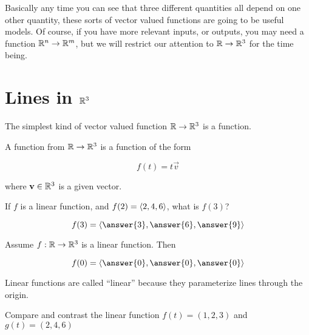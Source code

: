\documentclass{ximera}
\begin{document}
Basically any time you can see that three different quantities all depend on one other quantity, these sorts of vector valued functions are going to be useful models.  Of course, if you have more relevant inputs, or outputs, you may need a function $\mathbb R^n \to \mathbb R^m$, but we will restrict our attention to $\mathbb R \to \mathbb R^3$ for the time being.

\section{Lines in $\mathbb R^3$}

The simplest kind of vector valued function  $\mathbb R \to \mathbb R^3$ is a  function.

\begin{definition}
	A  function from $\mathbb R \to \mathbb R^3$ is a function of the form
	
	\[
	f(t) = t\vec{v}
	\] 
	
	where $\mathbf{v} \in \mathbb R^3$ is a given vector.
 \end{definition} 
 
 \begin{question}
 	If $f$ is a linear function, and $f(2) = \left\langle 2,4,6\right\rangle$, what is $f(3)$?
	
\[	
	f(3) = \vector{\answer{3},\answer{6},\answer{9}}
\]
 \end{question}
 
 \begin{question}
 	Assume $f:\mathbb R \to \mathbb R^3$ is a linear function.  Then 
	
	\[
	f(0) = \vector{\answer{0},\answer{0},\answer{0}}
	\]
 \end{question}
 
 Linear functions are called ``linear'' because they parameterize lines through the origin.  
 
 
 \begin{question}
	Compare and contrast the linear function $f(t) = (1,2,3)$ and $g(t)=(2,4,6)$
	
	\begin{multipleChoice}
	\end{multipleChoice}
	
 \end{question}
 
\end{document}
